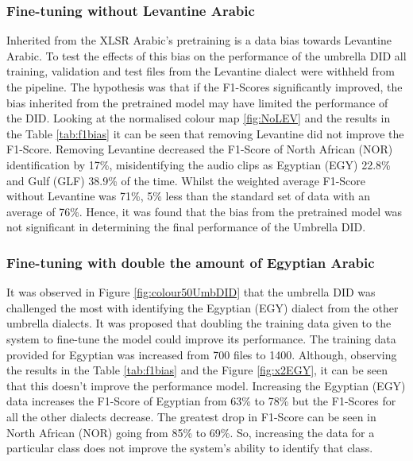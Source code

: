 \subsubsection{Fine-tuning without Levantine Arabic}
Inherited from the XLSR Arabic's pretraining is a data bias towards Levantine Arabic. 
To test the effects of this bias on the performance of the umbrella DID all training, validation and test files from the 
Levantine dialect were withheld from the pipeline. The hypothesis was that if the F1-Scores significantly improved, 
the bias inherited from the pretrained model may have limited the performance of the DID. Looking at the normalised 
colour map \ref{fig:NoLEV} and the results in the Table \ref{tab:f1bias} it can be seen that removing Levantine did not improve the F1-Score. 
Removing Levantine decreased the F1-Score of North African (NOR) identification by 17\%, misidentifying the audio clips as Egyptian (EGY) 22.8\% and Gulf (GLF) 38.9\% of the time. 
Whilst the weighted average F1-Score without Levantine was 71\%, 5\% less than the standard set of data with an average of 76\%. 
Hence, it was found that the bias from the pretrained model was not significant in determining the final performance of the Umbrella DID. 

\subsubsection{Fine-tuning with double the amount of Egyptian Arabic}
It was observed in Figure \ref{fig:colour50UmbDID} that the umbrella DID was challenged the most with identifying the Egyptian (EGY) dialect 
from the other umbrella dialects. It was proposed that doubling the training data given to the system to fine-tune the model could 
improve its performance. The training data provided for Egyptian was increased from 700 files to 1400. Although, observing the results in the Table 
\ref{tab:f1bias} and the Figure \ref{fig:x2EGY}, it can be seen that this doesn't improve the performance model. Increasing the Egyptian (EGY) data increases 
the F1-Score of Egyptian from 63\% to 78\% but the F1-Scores for all the other dialects decrease. The greatest drop in F1-Score can be seen in North African (NOR) going from 
85\% to 69\%. So, increasing the data for a particular class does not improve the system's ability to identify that class. 

